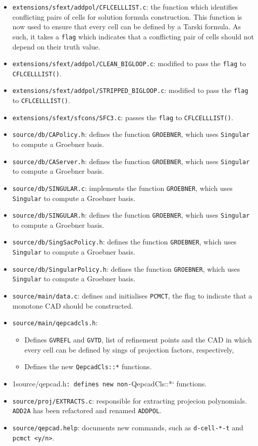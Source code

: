 \documentclass[
]{book}
\providecommand{\tightlist}{%
  \setlength{\itemsep}{0pt}\setlength{\parskip}{0pt}}
\theoremstyle{definition}
\theoremstyle{definition}
\theoremstyle{definition}
\theoremstyle{definition}
\theoremstyle{remark}
\begin{document}
\begin{itemize}
\item
  \texttt{extensions/sfext/addpol/CFLCELLLIST.c}: the function which identifies conflicting pairs of cells for solution formula construction. This function is now used to ensure that every cell can be defined by a Tarski formula. As such, it takes a \texttt{flag} which indicates that a conflicting pair of cells should not depend on their truth value.
\item
  \texttt{extensions/sfext/addpol/CLEAN\_BIGLOOP.c}: modified to pass the \texttt{flag} to \texttt{CFLCELLLIST()}.
\item
  \texttt{extensions/sfext/addpol/STRIPPED\_BIGLOOP.c}: modified to pass the \texttt{flag} to \texttt{CFLCELLLIST()}.
\item
  \texttt{extensions/sfext/sfcons/SFC3.c}: passes the \texttt{flag} to \texttt{CFLCELLLIST()}.
\item
  \texttt{source/db/CAPolicy.h}: defines the function \texttt{GROEBNER}, which uses \texttt{Singular} to compute a Groebner basis.
\item
  \texttt{source/db/CAServer.h}: defines the function \texttt{GROEBNER}, which uses \texttt{Singular} to compute a Groebner basis.
\item
  \texttt{source/db/SINGULAR.c}: implements the function \texttt{GROEBNER}, which uses \texttt{Singular} to compute a Groebner basis.
\item
  \texttt{source/db/SINGULAR.h}: defines the function \texttt{GROEBNER}, which uses \texttt{Singular} to compute a Groebner basis.
\item
  \texttt{source/db/SingSacPolicy.h}: defines the function \texttt{GROEBNER}, which uses \texttt{Singular} to compute a Groebner basis.
\item
  \texttt{source/db/SingularPolicy.h}: defines the function \texttt{GROEBNER}, which uses \texttt{Singular} to compute a Groebner basis.
\item
  \texttt{source/main/data.c}: defines and initialises \texttt{PCMCT}, the flag to indicate that a monotone CAD should be constructed.
\item
  \texttt{source/main/qepcadcls.h}:

  \begin{itemize}
  \tightlist
  \item
    Defines \texttt{GVREFL} and \texttt{GVTD}, list of refinement points and the CAD in which every cell can be defined by sings of projection factors, respectively,
  \item
    Defines the new \texttt{QepcadCls::*} functions.
  \end{itemize}
\item
  1source/qepcad.h\texttt{:\ defines\ new\ non-}QepcadCls::*` functions.
\item
  \texttt{source/proj/EXTRACTS.c}: responsible for extracting projecion polynomials. \texttt{ADD2A} has been refactored and renamed \texttt{ADDPOL}.
\item
  \texttt{source/qepcad.help}: documents new commands, such as \texttt{d-cell-*-t} and \texttt{pcmct\ \textless{}y/n\textgreater{}}.
\end{itemize}
\end{document}

